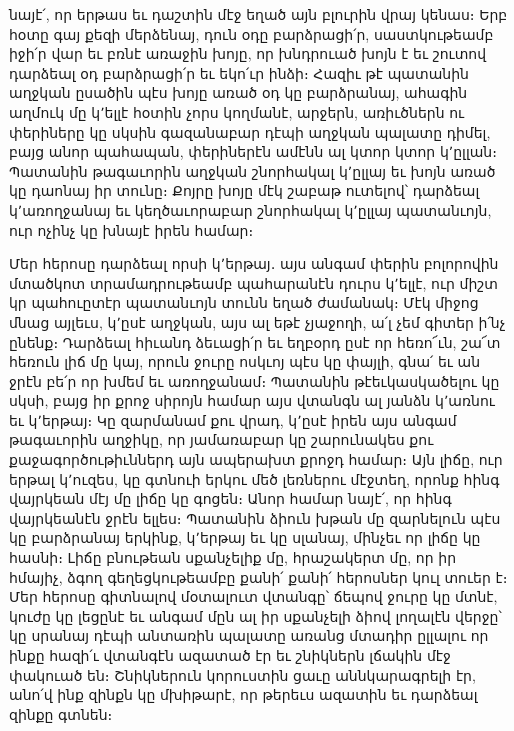 \documentclass{article}
\begin{document}
{նայէ՛, որ երթաս եւ դաշտին մէջ եղած այն բլուրին վրայ կենաս։ Երբ հօտը գայ քեզի մերձենայ, դուն օդը բարձրացի՛ր, սաստկութեամբ իջի՛ր վար եւ բռնէ առաջին խոյը, որ խնդրուած խոյն է եւ շուտով դարձեալ օդ բարձրացի՛ր եւ եկո՛ւր ինձի։ Հազիւ թէ պատանին աղջկան ըսածին պէս խոյը առած օդ կը բարձրանայ, ահագին աղմուկ մը կ՚ելլէ հօտին չորս կողմանէ, արջերն, առիւծներն ու փերիները կը սկսին գազանաբար դէպի աղջկան պալատը դիմել, բայց անոր պահապան, փերիներէն ամէնն ալ կտոր կտոր կ՚ըլլան։ Պատանին թագաւորին աղջկան շնորհակալ կ՚ըլլայ եւ խոյն առած կը դաոնայ իր տունը։ Քոյրը խոյը մէկ շաբաթ ուտելով՝ դարձեալ կ՚առողջանայ եւ կեղծաւորաբար շնորհակալ կ՚ըլլայ պատանւոյն, ուր ոչինչ կը խնայէ իրեն համար։

Մեր հերոսը դարձեալ որսի կ՚երթայ․ այս անգամ փերին բոլորովին մտածկոտ տրամադրութեամբ պահարանէն դուրս կ՚ելլէ, ուր միշտ կր պահուըտէր պատանւոյն տունն եղած ժամանակ։ Մէկ միջոց մնաց այլեւս, կ՚ըսէ աղջկան, այս ալ եթէ չյաջողի, ա՛լ չեմ գիտեր ի՛նչ ընենք։ Դարձեալ հիւանդ ձեւացի՛ր եւ եղբօրդ ըսէ որ հեռո՜ւն, շա՜տ հեռուն լիճ մը կայ, որուն ջուրը ոսկւոյ պէս կը փայլի, գնա՛ եւ ան ջրէն բե՛ր որ խմեմ եւ առողջանամ։ Պատանին թէեւկասկածելու կը սկսի, բայց իր քրոջ սիրոյն համար այս վտանգն ալ յանձն կ՚առնու եւ կ՚երթայ։ Կը զարմանամ քու վրադ, կ՚ըսէ իրեն այս անգամ թագաւորին աղջիկը, որ յամառաբար կը շարունակես քու քաջագործութիւններդ այն ապերախտ քրոջդ համար։ Այն լիճը, ուր երթալ կ՚ուզես, կը գտնուի երկու մեծ լեռներու մէջտեղ, որոնք հինգ վայրկեան մէյ մը լիճը կը գոցեն։ Անոր համար նայէ՛, որ հինգ վայրկեանէն ջրէն ելլես։ Պատանին ձիուն խթան մը զարնելուն պէս կը բարձրանայ երկինք, կ՚երթայ եւ կը սլանայ, մինչեւ որ լիճը կը հասնի։ Լիճը բնութեան սքանչելիք մը, հրաշակերտ մը, որ իր հմայիչ, ձգող գեղեցկութեամբը քանի՛ քանի՛ հերոսներ կուլ տուեր է։ Մեր հերոսը գիտնալով մօտալուտ վտանգը՝ ճեպով ջուրը կը մտնէ, կուժը կը լեցընէ եւ անգամ մըն ալ իր սքանչելի ձիով լողալէն վերջը՝ կը սրանայ դէպի անտառին պալատը առանց մտադիր ըլլալու որ ինքը հազի՛ւ վտանգէն ազատած էր եւ շնիկներն լճակին մէջ փակուած են։ Շնիկներուն կորուստին ցաւը աննկարագրելի էր, անո՛վ ինք զինքն կը մխիթարէ, որ թերեւս ազատին եւ դարձեալ զինքը գտնեն։

}
\end{document}
